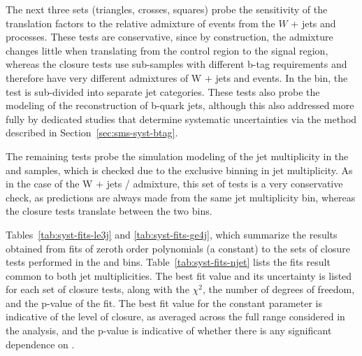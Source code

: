 The next three sets (triangles, crosses, squares) probe the
sensitivity of the \mj translation factors to the relative admixture of
events from the $W$ + jets and \ttbar processes. These tests are
conservative, since by construction, the admixture changes little when
translating from the \mj control region to the signal region, whereas the 
closure tests use sub-samples with different b-tag requirements and 
therefore have very different admixtures of W + jets and \ttbar events.  
In the \njetlow bin, the test is sub-divided into separate jet categories.
These tests also probe the modeling of the reconstruction of b-quark jets, 
although this also addressed more fully by dedicated studies that 
determine systematic uncertainties via the method described in
Section~\ref{sec:sms-syst-btag}.

The remaining tests probe the simulation modeling of
the jet multiplicity in the \mj and \gj samples, which is checked due 
to the exclusive binning in jet multiplicity. As in the case of the 
W + jets / \ttbar admixture, this set of tests  is a very conservative
 check, as predictions are always made from the same jet multiplicity bin,
whereas the closure tests translate between the two bins.

Tables~\ref{tab:syst-fits-le3j} and \ref{tab:syst-fits-ge4j}, which
summarize the results obtained from fits of zeroth order polynomials
(\ie a constant) to the sets of closure tests performed in the \njetlow 
and \njethigh bins.  Table~\ref{tab:syst-fits-njet} lists the fits result
common to both jet multiplicities. The best fit value and its uncertainty
is listed for each set of closure tests, along with the $\chi^{2}$, the number
of degrees of freedom, and the p-value of the fit. The best fit value
for the constant parameter is indicative of the level of closure, as
averaged across the full \scalht range considered in the analysis, and
the p-value is indicative of whether there is any significant
dependence on \scalht. 

